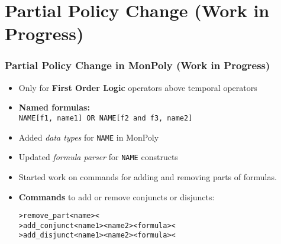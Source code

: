 \section{Partial Policy Change (Work in Progress)}

\begin{frame}
    \frametitle{Partial Policy Change in MonPoly (Work in Progress)}
    \begin{itemize}
        \item Only for \textbf{First Order Logic} operators above temporal operators
        \item \textbf{Named formulas:}\\
        \texttt{NAME[f1, name1] OR NAME[f2 and f3, name2]}
        \item Added \emph{data types} for \texttt{NAME} in MonPoly
        \item Updated \emph{formula parser} for \texttt{NAME} constructs
        \item Started work on commands for adding and removing parts of formulas.
        \item \textbf{Commands} to add or remove conjuncts or disjuncts:
\begin{alltt}
>remove\_part <name>< \\
>add\_conjunct <name1> <name2> <formula>< \\
>add\_disjunct <name1> <name2> <formula><
\end{alltt}
    \end{itemize}
\end{frame}

